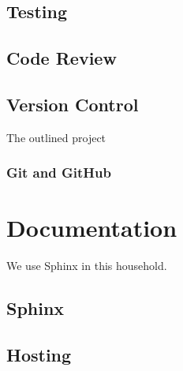 \subsection{Testing}


\subsection{Code Review}
\subsection{Version Control}
The outlined project 
\subsubsection{Git and GitHub}

\section{Documentation}
We use Sphinx in this household.
\subsection{Sphinx}

\subsection{Hosting}


